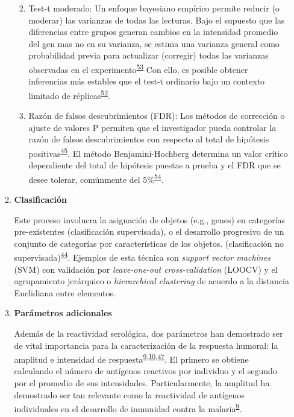 \documentclass[a4paper]{article}
\providecommand{\tightlist}{%
  \setlength{\itemsep}{0pt}\setlength{\parskip}{0pt}}
\begin{document}
\begin{enumerate}
\begin{enumerate}
    \begin{enumerate}
    \def\labelenumiii{\arabic{enumiii}.}
    \tightlist
    \item
      Test-t moderado: Un enfoque bayesiano empírico permite reducir (o
      moderar) las varianzas de todas las lecturas. Bajo el supuesto que
      las diferencias entre grupos generan cambios en la intensidad
      promedio del gen mas no en su varianza, se estima una varianza
      general como probabilidad previa para actualizar (corregir) todas
      las varianzas observadas en el
      experimento\textsuperscript{\protect\hyperlink{ref-smyth2004ebayes}{53}}
      Con ello, es posible obtener inferencias más estables que el
      test-t ordinario bajo un contexto limitado de
      réplicas\textsuperscript{\protect\hyperlink{ref-kayala2012cyber}{52}}.
    \item
      Razón de falsos descubrimientos (FDR): Los métodos de corrección o
      ajuste de valores P permiten que el investigador pueda controlar
      la razón de falsos descubrimientos con respecto al total de
      hipótesis
      positivas\textsuperscript{\protect\hyperlink{ref-brazma2001}{45}}.
      El método Benjamini-Hochberg determina un valor crítico
      dependiente del total de hipótesis puestas a prueba y el FDR que
      se desee tolerar, comúnmente del
      5\%\textsuperscript{\protect\hyperlink{ref-benjamini1995fdr}{54}}.
    \end{enumerate}
  \item
    \textbf{Clasificación}

    Este proceso involucra la asignación de objetos (e.g., genes) en
    categorías pre-existentes (clasificación supervisada), o el
    desarrollo progresivo de un conjunto de categorías por
    características de los objetos. (clasificación no
    supervisada)\textsuperscript{\protect\hyperlink{ref-allison2006}{44}}.
    Ejemplos de esta técnica son \emph{support vector machines} (SVM)
    con validación por \emph{leave-one-out cross-validation} (LOOCV) y
    el agrupamiento jerárquico o \emph{hierarchical clustering} de
    acuerdo a la distancia Euclidiana entre elementos.
  \item
    \textbf{Parámetros adicionales}

    Además de la reactividad serológica, dos parámetros han demostrado
    ser de vital importancia para la caracterización de la respuesta
    humoral: la amplitud e intensidad de
    respuesta\textsuperscript{\protect\hyperlink{ref-crompton2010}{9},\protect\hyperlink{ref-Helb2015exposure}{10},\protect\hyperlink{ref-King2015FOC}{47}}.
    El primero se obtiene calculando el número de antígenos reactivos
    por individuo y el segundo por el promedio de sus intensidades.
    Particularmente, la amplitud ha demostrado ser tan relevante como la
    reactividad de antígenos individuales en el desarrollo de inmunidad
    contra la
    malaria\textsuperscript{\protect\hyperlink{ref-crompton2010}{9}}. 
  \end{enumerate}
\end{enumerate}
\end{document}
